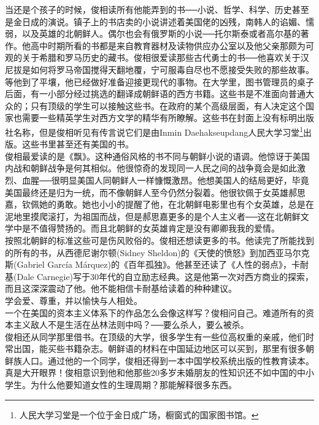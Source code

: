 当还是个孩子的时候，俊相读所有他能弄到的书──小说、哲学、科学、历史甚至是金日成的演说。镇子上的书店卖的小说讲述着美国佬的凶残，南韩人的谄媚、懦弱，以及英雄的北朝鲜人。偶尔也会有俄罗斯的小说──托尔斯泰或者高尔基的著作。他高中时期所看的书都是来自教育器材及读物供应办公室以及他父亲那颇为可观的关于希腊和罗马历史的藏书。俊相很爱读那些古代勇士的书──他喜欢关于汉尼拔是如何将罗马帝国搅得天翻地覆，宁可服毒自尽也不愿接受失败的那些故事。\\

等他到了平壤，他已经做好准备迎接更现代的事物。在大学里，图书管理员的桌子后面，有一小部分经过挑选的翻译成朝鲜语的西方书籍。这些书是不准面向普通大众的；只有顶级的学生可以接触这些书。在政府的某个高级层面，有人决定这个国家也需要一些精英学生对西方文学的精华有所瞭解。这些书在封面上没有标明出版社名称，但是俊相听见有传言说它们是由Inmin Daehakseupdang人民大学习堂\footnote{人民大学习堂是一个位于金日成广场，橱窗式的国家图书馆。}出版。这些书里甚至还有美国的书。\\

俊相最爱读的是《飘》。这种通俗风格的书不同与朝鲜小说的语调。他惊讶于美国内战和朝鲜战争是何其相似。他很惊奇的发现同一人民之间的战争竟会是如此激烈、血腥──很明显美国人同朝鲜人一样慷慨激昂。他想美国人的结局更好，毕竟美国最终还是归为一统，而不像朝鲜人至今仍然分裂着。他很钦佩于女英雄郝思嘉，钦佩她的勇敢。她也小小的提醒了他，在北朝鲜电影里也有个女英雄，总是在泥地里摸爬滚打，为祖国而战，但是郝思嘉更多的是个人主义者──这在北朝鲜文学中是不值得赞扬的。而且北朝鲜的女英雄肯定是没有卿卿我我的爱情。\\

按照北朝鲜的标准这些可是伤风败俗的。俊相还想读更多的书。他读完了所能找到的所有的书，从西德尼谢尔顿(Sidney Sheldon)的《天使的愤怒》到加西亚马尔克斯(Gabriel García Márquez)的《百年孤独》。他甚至还读了《人性的弱点》，卡耐基(Dale Carnegie)写于30年代的自立励志经典。这是他第一次对西方商业的探索，而且这深深震动了他。他不能相信卡耐基给读着的种种建议。\\

学会爱、尊重，并以愉快与人相处。\\

一个在美国的资本主义体系下的作品怎么会像这样写？俊相问自己。难道所有的资本主义敌人不是生活在丛林法则中吗？──要么杀人，要么被杀。\\

俊相还从同学那里借书。在顶级的大学，很多学生有一些位高权重的亲戚，他们时常出国，能买些书籍杂志。朝鲜语的材料在中国延边地区可以买到，那里有很多朝鲜族人口。通过他的一个同学，俊相还得到一本中国学校系统出版的性教育读本。真是大开眼界！俊相意识到他和他那些20多岁未婚朋友的性知识还不如中国的中小学生。为什么他要知道女性的生理周期？那能解释很多东西。\\


